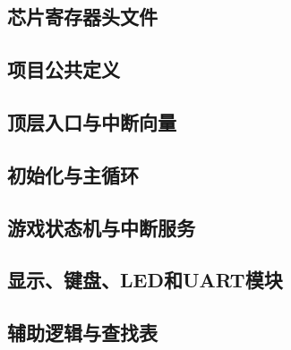 ﻿\documentclass[UTF8,a4paper,12pt]{ctexart}
\begin{document}
\subsection{芯片寄存器头文件}


\subsection{项目公共定义}


\subsection{顶层入口与中断向量}



\subsection{初始化与主循环}



\subsection{游戏状态机与中断服务}



\subsection{显示、键盘、LED和UART模块}





\subsection{辅助逻辑与查找表}


\end{document}
